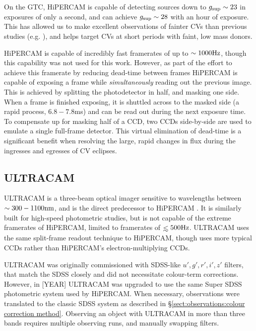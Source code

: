 On the GTC, HiPERCAM is capable of detecting sources down to $g_{\rm sup} \sim 23$ in exposures of only a second, and can achieve $g_{\rm sup} \sim 28$ with an hour of exposure. This has allowed us to make excellent observations of fainter CVs than previous studies (e.g. \citealt{McallisterThesis}), and helps target CVs at short periods with faint, low mass donors.

HiPERCAM is capable of incredibly fast framerates of up to $\sim 1000 \rm Hz$, though this capability was not used for this work.
However, as part of the effort to achieve this framerate by reducing dead-time between frames HiPERCAM is capable of exposing a frame while {\it simultaneously} reading out the previous image.
This is achieved by splitting the photodetector in half, and masking one side. When a frame is finished exposing, it is shuttled across to the masked side (a rapid process, $6.8 - 7.8$ms) and can be read out during the next exposure time. To compensate up for masking half of a CCD, two CCDs side-by-side are used to emulate a single full-frame detector.
This virtual elimination of dead-time is a significant benefit when resolving the large, rapid changes in flux during the ingresses and egresses of CV eclipses.


\subsection{ULTRACAM}
\label{sect:observations:ultracam}

ULTRACAM is a three-beam optical imager sensitive to wavelengths between $\sim 300 - 1100 \rm nm$, and is the direct predecessor to HiPERCAM \citep{dhillon2007}.
It is similarly built for high-speed photometric studies, but is not capable of the extreme framerates of HiPERCAM, limited to framerates of $\lesssim 500 \rm Hz$.
ULTRACAM uses the same split-frame readout technique to HiPERCAM, though uses more typical CCDs rather than HiPERCAM's electron-multiplying CCDs.

ULTRACAM was originally commissioned with SDSS-like $u',g',r',i',z'$ filters, that match the SDSS closely and did not necessitate colour-term corrections. However, in [YEAR]  ULTRACAM was upgraded to use the same Super SDSS photometric system used by HiPERCAM. When necessary, observations were translated to the classic SDSS system as described in \S\ref{sect:observations:colour correction method}.
Observing an object with ULTRACAM in more than three bands requires multiple observing runs, and manually swapping filters.


